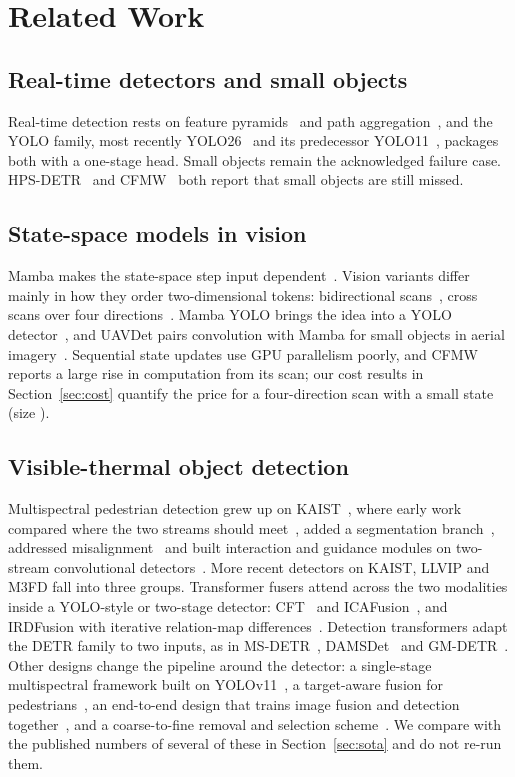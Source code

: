 \section{Related Work}
\label{sec:related}
\subsection{Real-time detectors and small objects}
Real-time detection rests on feature pyramids~\cite{lin2017fpn} and path aggregation~\cite{liu2018panet}, and the YOLO family, most recently YOLO26~\cite{yolo26_2026} and its predecessor YOLO11~\cite{yolo11_2024}, packages both with a one-stage head. Small objects remain the acknowledged failure case. HPS-DETR~\cite{wang2025hpsdetr} and CFMW~\cite{li2025cfmw} both report that small objects are still missed.

\subsection{State-space models in vision}
Mamba makes the state-space step input dependent~\cite{gu2023mamba}. Vision variants differ mainly in how they order two-dimensional tokens: bidirectional scans~\cite{zhu2024vim}, cross scans over four directions~\cite{liu2024vmamba}. Mamba YOLO brings the idea into a YOLO detector~\cite{wang2025mambayolo}, and UAVDet pairs convolution with Mamba for small objects in aerial imagery~\cite{yang2026uavdet}. Sequential state updates use GPU parallelism poorly, and CFMW reports a large rise in computation from its scan; our cost results in Section~\ref{sec:cost} quantify the price for a four-direction scan with a small state (size \cfgDState{}).

\subsection{Visible-thermal object detection}
Multispectral pedestrian detection grew up on KAIST~\cite{hwang2015kaist}, where early work compared where the two streams should meet~\cite{liu2016halfway}, added a segmentation branch~\cite{li2018msdsrcnn}, addressed misalignment~\cite{zhang2019arcnn} and built interaction and guidance modules on two-stream convolutional detectors~\cite{zhang2019cian,zhang2021gaff,cao2023csaa}. More recent detectors on KAIST, LLVIP and M3FD fall into three groups. Transformer fusers attend across the two modalities inside a YOLO-style or two-stage detector: CFT~\cite{fang2021cft} and ICAFusion~\cite{shen2024icafusion}, and IRDFusion with iterative relation-map differences~\cite{shen2025irdfusion}. Detection transformers adapt the DETR family to two inputs, as in MS-DETR~\cite{xing2024msdetr}, DAMSDet~\cite{guo2024damsdet} and GM-DETR~\cite{xiao2024gmdetr}. Other designs change the pipeline around the detector: a single-stage multispectral framework built on YOLOv11~\cite{wan2025yolov11rgbt}, a target-aware fusion for pedestrians~\cite{zhang2024tfdet}, an end-to-end design that trains image fusion and detection together~\cite{zhang2024e2emfd}, and a coarse-to-fine removal and selection scheme~\cite{zhao2026rsdet}. We compare with the published numbers of several of these in Section~\ref{sec:sota} and do not re-run them.

